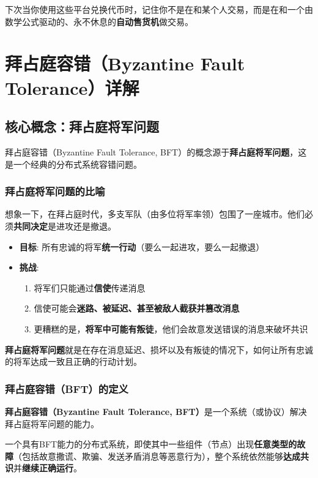 \documentclass[12pt]{ctexart}
\begin{document}
下次当你使用这些平台兑换代币时，记住你不是在和某个人交易，而是在和一个由数学公式驱动的、永不休息的\textbf{自动售货机}做交易。

\newpage

\section{拜占庭容错（Byzantine Fault Tolerance）详解}

\subsection{核心概念：拜占庭将军问题}

拜占庭容错（Byzantine Fault Tolerance, BFT）的概念源于\textbf{拜占庭将军问题}，这是一个经典的分布式系统容错问题。

\subsubsection{拜占庭将军问题的比喻}

想象一下，在拜占庭时代，多支军队（由多位将军率领）包围了一座城市。他们必须\textbf{共同决定}是进攻还是撤退。

\begin{itemize}
    \item \textbf{目标}: 所有忠诚的将军\textbf{统一行动}（要么一起进攻，要么一起撤退）
    \item \textbf{挑战}:
    \begin{enumerate}
        \item 将军们只能通过\textbf{信使}传递消息
        \item 信使可能会\textbf{迷路、被延迟、甚至被敌人截获并篡改消息}
        \item 更糟糕的是，\textbf{将军中可能有叛徒}，他们会故意发送错误的消息来破坏共识
    \end{enumerate}
\end{itemize}

\textbf{拜占庭将军问题}就是在存在消息延迟、损坏以及有叛徒的情况下，如何让所有忠诚的将军达成一致且正确的行动计划。

\subsubsection{拜占庭容错（BFT）的定义}

\textbf{拜占庭容错（Byzantine Fault Tolerance, BFT）}是一个系统（或协议）解决拜占庭将军问题的能力。

一个具有BFT能力的分布式系统，即使其中一些组件（节点）出现\textbf{任意类型的故障}（包括故意撒谎、欺骗、发送矛盾消息等恶意行为），整个系统依然能够\textbf{达成共识}并\textbf{继续正确运行}。
\end{document}
